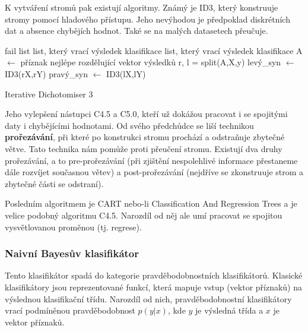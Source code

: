 K vytváření stromů pak existují algoritmy. Známý je ID3, který konstruuje stromy pomocí hladového přístupu. Jeho nevýhodou je předpoklad diskrétních dat a absence chybějích hodnot. Také se na malých datasetech přeučuje. 

\begin{algorithm}[h]

    
    
    
    
     {
        \Return fail list
     }
     {
        \Return list, který vrací výsledek klasifikace
     }
     {
        \Return list, který vrací výsledek klasifikace
     }
     \Else
     {
        A $\leftarrow$ příznak nejlépe rozdělující vektor výsledků\;
        r, l  = split(A,X,y)\;
        levý\_syn $\leftarrow$ ID3(rX,rY)\;
        pravý\_syn $\leftarrow$ ID3(lX,lY)\;
     }
    
     \caption{Iterative Dichotomiser 3}
     \label{id3}
    \end{algorithm}

Jeho vylepšení nástupci C4.5 a C5.0, kteří už dokážou pracovat i se spojitými daty i chybějícími hodnotami. Od svého předchůdce se liší technikou \textbf{prořezávání}, při které po konstrukci stromu prochází a odstraňuje zbytečné větve. Tato technika nám pomůže proti přeučení stromu. Existují dva druhy prořezávání, a to pre-prořezávání (při zjištění nespolehlivé informace přestaneme dále rozvíjet současnou větev) a post-prořezávání (nejdříve se zkonstruuje strom a zbytečné části se odstraní).

Posledním algoritmem je CART nebo-li Classification And Regression Trees a je velice podobný algoritmu C4.5. Narozdíl od něj ale umí pracovat se spojitou vysvětlovanou proměnou (tj. regrese). 


\subsubsection{Naivní Bayesův klasifikátor}
Tento klasifikátor spadá do kategorie pravděbodobnostních klasifikátorů. Klasické klasifikátory jsou reprezentované funkcí, která mapuje vstup (vektor příznaků) na výslednou klasifikační třídu. Narozdíl od nich, pravděbodobnostní klasifikátory vrací podmíněnou pravděbodobnost $p(y|x)$, kde $y$ je výsledná třída  a $x$ je vektor příznaků.

